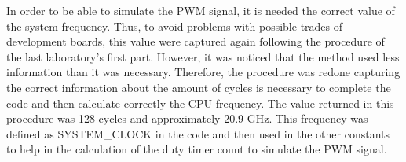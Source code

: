 In order to be able to simulate the PWM signal, it is needed the correct value of the system frequency. Thus, to avoid problems with possible trades of development boards, this value were captured again following the procedure of the last laboratory's first part. However, it was noticed that the method used less information than it was necessary. Therefore, the procedure was redone capturing the correct information about the amount of cycles is necessary to complete the code and then calculate correctly the CPU frequency. The value returned in this procedure was 128 cycles and approximately 20.9 GHz. This frequency was defined as SYSTEM_CLOCK in the code and then used in the other constants to help in the calculation of the duty timer count to simulate the PWM signal.